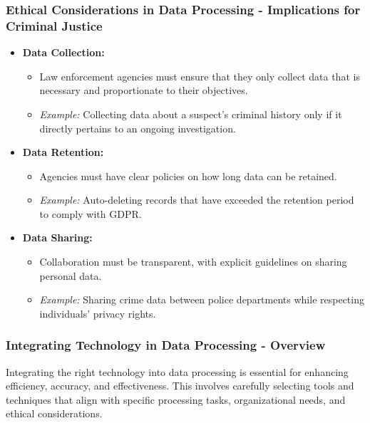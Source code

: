\documentclass[aspectratio=169]{beamer}
\begin{document}
\begin{frame}[fragile]
    \frametitle{Ethical Considerations in Data Processing - Implications for Criminal Justice}
    \begin{itemize}
        \item \textbf{Data Collection:} 
            \begin{itemize}
                \item Law enforcement agencies must ensure that they only collect data that is necessary and proportionate to their objectives.
                \item \textit{Example:} Collecting data about a suspect's criminal history only if it directly pertains to an ongoing investigation.
            \end{itemize}
        \item \textbf{Data Retention:}
            \begin{itemize}
                \item Agencies must have clear policies on how long data can be retained.
                \item \textit{Example:} Auto-deleting records that have exceeded the retention period to comply with GDPR.
            \end{itemize}
        \item \textbf{Data Sharing:}
            \begin{itemize}
                \item Collaboration must be transparent, with explicit guidelines on sharing personal data.
                \item \textit{Example:} Sharing crime data between police departments while respecting individuals' privacy rights.
            \end{itemize}
    \end{itemize}
\end{frame}

\begin{frame}[fragile]
    \frametitle{Integrating Technology in Data Processing - Overview}
    Integrating the right technology into data processing is essential for enhancing efficiency, accuracy, and effectiveness. This involves carefully selecting tools and techniques that align with specific processing tasks, organizational needs, and ethical considerations.
\end{frame}
\end{document}
